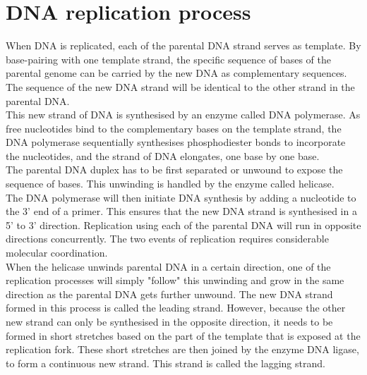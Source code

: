 \documentclass[11pt]{article}
\begin{document}
\newpage

\section{DNA replication process}
\label{sec:org8634520}
When DNA is replicated, each of the parental DNA strand serves as template. By base-pairing with one template strand, the specific sequence of bases of the parental genome can be carried by the new DNA as complementary sequences. The sequence of the new DNA strand will be identical to the other strand in the parental DNA.
\\[0pt]

This new strand of DNA is synthesised by an enzyme called DNA polymerase. As free nucleotides bind to the complementary bases on the template strand, the DNA polymerase sequentially synthesises phosphodiester bonds to incorporate the nucleotides, and the strand of DNA elongates, one base by one base.
\\[0pt]

The parental DNA duplex has to be first separated or unwound to expose the sequence of bases. This unwinding is handled by the enzyme called helicase.
\\[0pt]

The DNA polymerase will then initiate DNA synthesis by adding a nucleotide to the 3' end of a primer. This ensures that the new DNA strand is synthesised in a 5' to 3' direction. Replication using each of the parental DNA will run in opposite directions concurrently. The two events of replication requires considerable molecular coordination.
\\[0pt]

When the helicase unwinds parental DNA in a certain direction, one of the replication processes will simply "follow" this unwinding and grow in the same direction as the parental DNA gets further unwound. The new DNA strand formed in this process is called the leading strand. However, because the other new strand can only be synthesised in the opposite direction, it needs to be formed in short stretches based on the part of the template that is exposed at the replication fork. These short stretches are then joined by the enzyme DNA ligase, to form a  continuous new strand. This strand is called the lagging strand.

\newpage
\end{document}
